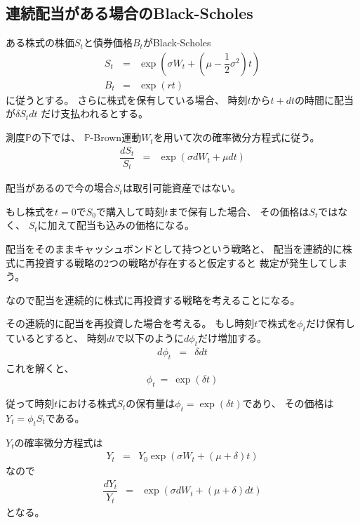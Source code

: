 \documentclass[uplatex,a4j,12pt,dvipdfmx]{jsarticle}
\begin{document}
\subsection*{連続配当がある場合のBlack-Scholes}

ある株式の株価$S_{t}$と債券価格$B_{t}$がBlack-Scholes
%
%
\begin{eqnarray*}
	S_{t}
	&=&
	\exp \left( \sigma W_{t} + \left( \mu - \dfrac{1}{2} \sigma^{2} \right) t \right)
	\\
	B_{t}
	&=&
	\exp (rt)
\end{eqnarray*}
%
%
に従うとする。
さらに株式を保有している場合、
時刻$t$から$t+dt$の時間に配当が$\delta S_{t} dt$
だけ支払われるとする。

測度$\mathbb{P}$の下では、
$\mathbb{P}$-Brown運動$W_{t}$を用いて次の確率微分方程式に従う。
%
%
\begin{eqnarray*}
	\dfrac{dS_{t}}{S_{t}}
	&=&
	\exp \left( \sigma dW_{t} + \mu dt \right)
\end{eqnarray*}
%
%

配当があるので今の場合$S_{t}$は取引可能資産ではない。

もし株式を$t=0$で$S_{0}$で購入して時刻$t$まで保有した場合、
その価格は$S_{t}$ではなく、
$S_{t}$に加えて配当も込みの価格になる。

配当をそのままキャッシュボンドとして持つという戦略と、
配当を連続的に株式に再投資する戦略の2つの戦略が存在すると仮定すると
裁定が発生してしまう。

なので配当を連続的に株式に再投資する戦略を考えることになる。

その連続的に配当を再投資した場合を考える。
もし時刻$t$で株式を$\phi_{t}$だけ保有しているとすると、
時刻$dt$で以下のように$d \phi_{t}$だけ増加する。
%
%
\begin{eqnarray*}
	d \phi_{t}
	&=&
	\delta dt
\end{eqnarray*}
%
%
これを解くと、
$$
	\phi_{t}
	\ = \
	\exp ( \delta t )
$$

従って時刻$t$における株式$S_{t}$の保有量は$\phi_{t} = \exp ( \delta t)$であり、
その価格は$Y_{t} = \phi_{t} S_{t}$である。

$Y_{t}$の確率微分方程式は
%
%
\begin{eqnarray*}
	Y_{t}
	&=&
	Y_{0} \exp \left( \sigma W_{t} + (\mu + \delta) t \right)
\end{eqnarray*}
%
%
なので
%
%
\begin{eqnarray*}
	\dfrac{dY_{t}}{Y_{t}}
	&=&
	\exp \left( \sigma dW_{t} + (\mu + \delta) dt \right)
\end{eqnarray*}
%
%
となる。
\end{document}

